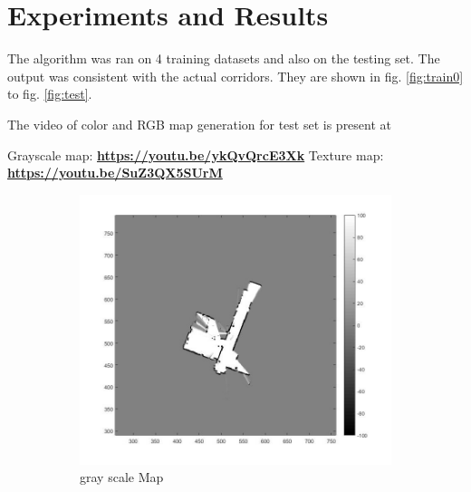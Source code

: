 \documentclass[fleqn,10pt]{SelfArx} %
\begin{document}
\section{Experiments and Results}
\label{sec:results}
The algorithm was ran on 4 training datasets and also on the testing set. The output was consistent with the actual corridors. They are shown in fig. \ref{fig:train0} to fig. \ref{fig:test}. 

The video of color and RGB map generation for test set is present at

Grayscale map: \textbf{\hyperref[https://youtu.be/ykQvQrcE3Xk]{https://youtu.be/ykQvQrcE3Xk}}
Texture map: \textbf{\hyperref[https://youtu.be/SuZ3QX5SUrM]{https://youtu.be/SuZ3QX5SUrM}}

\begin{figure}
    \centering
    \begin{subfigure}[t]{0.5\textwidth}
        \centering
        \includegraphics[scale = 0.5]{set0_map.jpg}
        \caption{gray scale Map}
    \end{subfigure}%
    ~ 
    \begin{subfigure}[t]{0.5\textwidth}
        \centering

\end{subfigure}
\end{figure}
\end{document}
